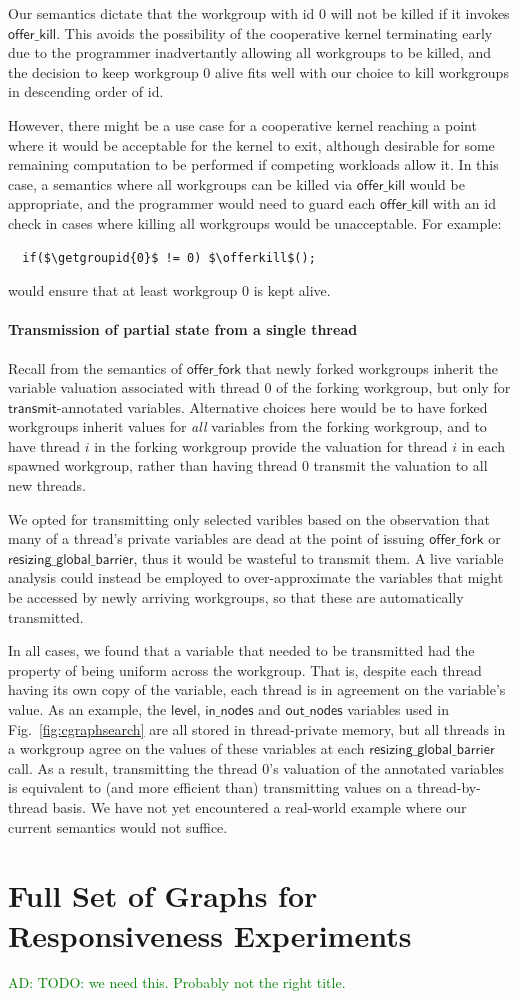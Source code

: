 \documentclass[numbers,nocopyrightspace,10pt]{sigplanconf}
\newcommand{\ADComment}[1]{\textcolor{green}{AD: #1}}
\newcommand{\myfig}{Fig.~}
\newcommand{\transmit}{\mathsf{transmit}}
\newcommand{\offerfork}{\mathsf{offer\_fork}}
\newcommand{\offerkill}{\mathsf{offer\_kill}}
\newcommand{\resizingglobalbarrier}{\mathsf{resizing\_global\_barrier}}
\newcommand{\getgroupid}{\mathsf{get\_group\_id}}
\newcommand{\keyword}[1]{\mathsf{#1}}
\begin{document}
Our semantics dictate that the workgroup with id 0 will not be killed
if it invokes $\offerkill$.  This avoids the possibility of the
cooperative kernel terminating early due to the programmer
inadvertantly allowing all workgroups to be killed, and the decision
to keep workgroup 0 alive fits well with our choice to kill workgroups
in descending order of id.

However, there might be a use case for a cooperative kernel reaching a
point where it would be acceptable for the kernel to exit, although
desirable for some remaining computation to be performed if competing
workloads allow it.  In this case, a semantics where all workgroups can be killed via $\offerkill$ would be appropriate, and the programmer would need to guard each $\offerkill$ with an id check in cases where killing all workgroups would be unacceptable.  For example:
%
\lstset{basicstyle=\tt,numbers=none}
\begin{lstlisting}
  if($\getgroupid{0}$ != 0) $\offerkill$();
\end{lstlisting}
\lstset{basicstyle=\scriptsize\tt,numbers=left}
%
would ensure that at least workgroup 0 is kept alive.

\paragraph{Transmission of partial state from a single thread}

Recall from the semantics of $\offerfork$ that newly forked workgroups
inherit the variable valuation associated with thread 0 of the forking
workgroup, but only for $\transmit$-annotated variables.  Alternative
choices here would be to have forked workgroups inherit values for
\emph{all} variables from the forking workgroup, and to have thread
$i$ in the forking workgroup provide the valuation for thread $i$ in
each spawned workgroup, rather than having thread 0 transmit the
valuation to all new threads.

We opted for transmitting only selected varibles based on the
observation that many of a thread's private variables are dead at the
point of issuing $\offerfork$ or $\resizingglobalbarrier$, thus it
would be wasteful to transmit them.  A live variable analysis could
instead be employed to over-approximate the variables that might be
accessed by newly arriving workgroups, so that these are automatically
transmitted.

In all cases, we found that a variable that needed to be transmitted
had the property of being uniform across the workgroup.  That is,
despite each thread having its own copy of the variable, each thread
is in agreement on the variable's value.  As an example, the
$\keyword{level}$, $\keyword{in\_nodes}$ and $\keyword{out\_nodes}$
variables used in \myfig\ref{fig:cgraphsearch} are all stored in thread-private
memory, but all threads in a workgroup agree on the values of these
variables at each $\resizingglobalbarrier$ call.  As a result,
transmitting the thread 0's valuation of the annotated variables is
equivalent to (and more efficient than) transmitting values on a
thread-by-thread basis.  We have not yet encountered a real-world
example where our current semantics would not suffice.


\section{Full Set of Graphs for Responsiveness Experiments}

\ADComment{TODO: we need this.  Probably not the right title.}
\end{document}
